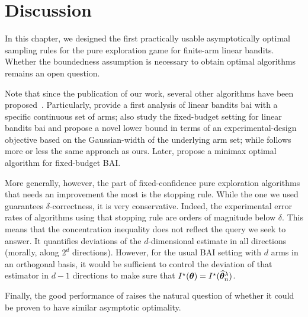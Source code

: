 \section{Discussion}\label{sec:lgc.discussion}

In this chapter, we designed the first practically usable asymptotically optimal sampling rules for the pure exploration game for finite-arm linear bandits. Whether the boundedness assumption is necessary to obtain optimal algorithms remains an open question.

Note that since the publication of our work, several other algorithms have been proposed~\citep{zaki2020linear,jedra2020linear,katz-samuels2020practical}. Particularly, \cite{jedra2020linear} provide a first analysis of linear bandits \gls{bai} with a specific continuous set of arms; \cite{katz-samuels2020practical} also study the fixed-budget setting for linear bandits \gls{bai} and propose a novel lower bound in terms of an experimental-design objective based on the Gaussian-width of the underlying arm
set; while \cite{zaki2020linear} follows more or less the same approach as ours. Later, \cite{yang2021linear} propose a minimax optimal algorithm for fixed-budget BAI.

More generally, however, the part of fixed-confidence pure exploration algorithms that needs an improvement the most is the stopping rule. While the one we used guarantees $\delta$-correctness, it is very conservative. Indeed, the experimental error rates of algorithms using that stopping rule are orders of magnitude below $\delta$. This means that the concentration inequality does not reflect the query we seek to answer. It quantifies deviations of the $d$-dimensional estimate in all directions (morally, along $2^d$ directions). However, for the usual BAI setting with $d$ arms in an orthogonal basis, it would be sufficient to control the deviation of that estimator in $d-1$ directions to make sure that $I^\star({\boldsymbol \theta}) = I^\star(\widehat{{\boldsymbol \theta}}_n^\lambda)$.

Finally, the good performance of \LGapE raises the natural question of whether it could be proven to have similar asymptotic optimality.

